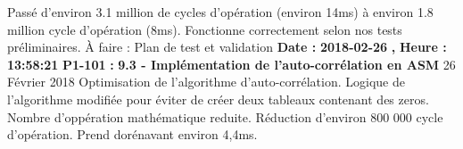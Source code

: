 \documentclass{article}%
\begin{document}
Passé d'environ 3.1 million de cycles d'opération (environ 14ms) à environ 1.8 million cycle d'opération (8ms).\newline%
Fonctionne correctement selon nos tests préliminaires.\newline%
À faire : Plan de test et validation\newline%
\newline%
%
\textbf{Date : }%
\textbf{2018{-}02{-}26}%
\textbf{,}%
\textbf{ Heure : }%
\textbf{13:58:21}%
\newline%
%
\textbf{P1{-}101 }%
\textbf{ : }%
\textbf{ 9.3 {-} Implémentation de l'auto{-}corrélation en ASM}%
\newline%
\newline%
%
26 Février 2018\newline%
Optimisation de l'algorithme d'auto{-}corrélation. Logique de l'algorithme modifiée pour éviter de créer deux tableaux contenant des zeros. Nombre d'oppération mathématique reduite.\newline%
Réduction d'environ 800 000 cycle d'opération. Prend dorénavant environ 4,4ms.\newline%
\newline%
%
\newpage

%
\end{document}
